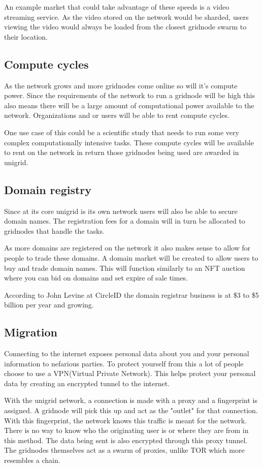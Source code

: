\documentclass[12pt]{article}
\begin{document}
An example market that could take advantage of these speeds is a video streaming service. As the video stored on the network would be sharded, users viewing the video would always be loaded from the closest gridnode swarm to their location.
   

\subsection*{Compute cycles}
As the network grows and more gridnodes come online so will it's compute power. Since the requirements of the network to run a gridnode will be high this also means there will be a large amount of computational power available to the network. Organizations and or users will be able to rent compute cycles. 

One use case of this could be a scientific study that needs to run some very complex computationally intensive tasks. These compute cycles will be available to rent on the network in return those gridnodes being used are awarded in unigrid.

\subsection*{Domain registry}
Since at its core unigrid is its own network users will also be able to secure domain names. The registration fees for a domain will in turn be allocated to gridnodes that handle the tasks.

As more domains are registered on the network it also makes sense to allow for people to trade these domains. A domain market will be created to allow users to buy and trade domain names. This will function similarly to an NFT auction where you can bid on domains and set expire of sale times.

According to John Levine at CircleID \cite{john2018} the domain registrar business is at \$3 to \$5 billion per year and growing.


\subsection*{Migration }
Connecting to the internet exposes personal data about you and your personal information to nefarious parties. To protect yourself from this a lot of people choose to use a VPN(Virtual Private Network). This helps protect your personal data by creating an encrypted tunnel to the internet.

With the unigrid network, a connection is made with a proxy and a fingerprint is assigned. A gridnode will pick this up and act as the "outlet" for that connection. With this fingerprint, the network knows this traffic is meant for the network. There is no way to know who the originating user is or where they are from in this method. The data being sent is also encrypted through this proxy tunnel. The gridnodes themselves act as a swarm of proxies, unlike TOR which more resembles a chain.
\end{document}

